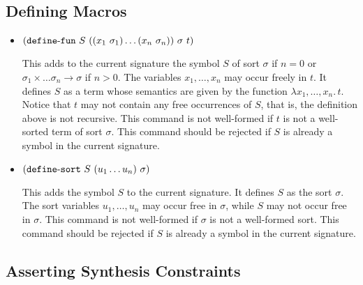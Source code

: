 \documentclass[english,a4paper,10pt]{article}
\begin{document}
\subsection{Defining Macros}

\begin{itemize}
\item ${\tt (}{\tt define\mbox{-}fun}\mbox{ }S\mbox{ }{\tt (}{\tt (}x_1\mbox{ }\sigma_1{\tt )} \ldots {\tt (}x_n\mbox{ }\sigma_n{\tt )}{\tt )}\mbox{ }\sigma\mbox{ }t{\tt )}$

This adds to the current signature
the symbol $S$ of sort $\sigma$
if $n=0$ or $\sigma_1 \times \ldots \sigma_n \rightarrow \sigma$ if $n>0$.
The variables $x_1, \ldots, x_n$ may occur freely in $t$.
It defines $S$ as a term whose semantics are given by the function
$\lambda x_1, \ldots, x_n.\, t$.
Notice that $t$ may not contain any free occurrences of $S$,
that is, the definition above is not recursive.
This command is not well-formed if $t$ is not a well-sorted
term of sort $\sigma$.
This command should be rejected if $S$ is already
a symbol in the current signature.

\item ${\tt (}{\tt define\mbox{-}sort}\mbox{ }S\mbox{ }{\tt (}u_1 \ldots u_n{\tt )}\mbox{ }\sigma{\tt )}$

This adds the symbol $S$ to the current signature.
It defines $S$ as the sort $\sigma$.
The sort variables $u_1, \ldots, u_n$
may occur free in $\sigma$,
while $S$ may not occur free in $\sigma$.
This command is not well-formed if $\sigma$
is not a well-formed sort.
This command should be rejected if $S$ is already
a symbol in the current signature.

\end{itemize}

\subsection{Asserting Synthesis Constraints}
\end{document}
